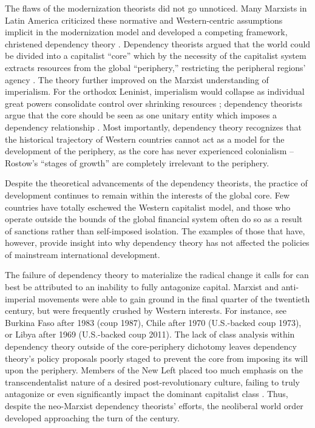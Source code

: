 \documentclass[american]{../../../coursework}
\begin{document}
The flaws of the modernization theorists did not go unnoticed. Many Marxists
in Latin America criticized these normative and Western-centric assumptions
implicit in the modernization model and developed a competing framework,
christened dependency theory \parencite{So1990}. Dependency theorists argued
that the world could be divided into a capitalist ``core'' which by the
necessity of the capitalist system extracts resources from the global
``periphery,'' restricting the peripheral regions' agency
\parencite{Frank1966}. The theory further improved on the Marxist
understanding of imperialism. For the orthodox Leninist, imperialism would
collapse as individual great powers consolidate control over shrinking
resources \parencite{Lenin1917}; dependency theorists argue that the core
should be seen as one unitary entity which imposes a dependency relationship
\parencite{Ferraro2008}. Most importantly, dependency theory recognizes that
the historical trajectory of Western countries cannot act as a model for the
development of the periphery, as the core has never experienced colonialism
\parencite{So1990} -- Rostow's ``stages of growth'' are completely irrelevant
to the periphery.

Despite the theoretical advancements of the dependency theorists, the practice
of development continues to remain within the interests of the global core.
Few countries have totally eschewed the Western capitalist model, and those
who operate outside the bounds of the global financial system often do so as a
result of sanctions rather than self-imposed isolation. The examples of those
that have, however, provide insight into why dependency theory has not
affected the policies of mainstream international development.

The failure of dependency theory to materialize the radical change it calls
for can best be attributed to an inability to fully antagonize capital.
Marxist and anti-imperial movements were able to gain ground in the final
quarter of the twentieth century, but were frequently crushed by Western
interests. For instance, see Burkina Faso after 1983 (coup 1987), Chile after
1970 (U.S.-backed coup 1973), or Libya after 1969 (U.S.-backed coup 2011).
The lack of class analysis within dependency theory outside of the
core-periphery dichotomy leaves dependency theory's policy proposals poorly
staged to prevent the core from imposing its will upon the periphery. Members
of the New Left placed too much emphasis on the transcendentalist nature of a
desired post-revolutionary culture, failing to truly antagonize or even
significantly impact the dominant capitalist class
\parencite[see][]{Schiff1973}. Thus, despite the neo-Marxist dependency
theorists' efforts, the neoliberal world order developed approaching the turn
of the century.
\end{document}
